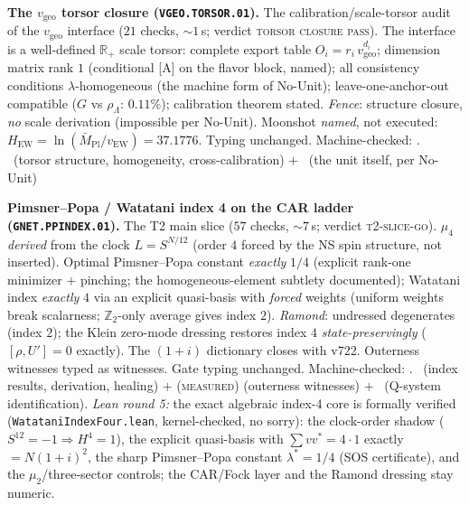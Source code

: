 \documentclass[11pt,a4paper]{article}
\newcommand{\Mbar}{\bar M_{\mathrm{Pl}}}
\newcommand{\Z}{\mathbb{Z}}
\theoremstyle{definition}
\begin{document}
\par\smallskip\noindent\textbf{The $v_{\mathrm{geo}}$ torsor closure
(\texttt{VGEO.TORSOR.01}).}
The calibration/scale-torsor audit of the $v_{\mathrm{geo}}$
interface ($21$ checks, ${\sim}1$\,s; verdict \textsc{torsor closure
pass}).  The interface is a well-defined $\mathbb R_+$ scale torsor:
complete export table $O_i=r_i\,v_{\mathrm{geo}}^{d_i}$; dimension
matrix rank $1$ (conditional [A] on the flavor block, named); all
consistency conditions $\lambda$-homogeneous (the machine form of
No-Unit); leave-one-anchor-out compatible ($G$ vs $\rho_\Lambda$:
$0.11\%$); calibration theorem stated.  \emph{Fence}: structure
closure, \emph{no} scale derivation (impossible per No-Unit).
Moonshot \emph{named}, not executed:
$H_{\mathrm{EW}}=\ln(\Mbar/v_{\mathrm{EW}})=37.1776$.  Typing
unchanged.
Machine-checked: .
\mE\ (torsor structure, homogeneity, cross-calibration) $+$ \mO\
(the unit itself, per No-Unit)
\par\smallskip

\par\smallskip\noindent\textbf{Pimsner--Popa / Watatani index 4 on
the CAR ladder (\texttt{GNET.PPINDEX.01}).}
The T2 main slice ($57$ checks, ${\sim}7$\,s; verdict
\textsc{t2-slice-go}).  $\mu_4$ \emph{derived} from the clock
$L=S^{N/12}$ (order $4$ forced by the NS spin structure, not
inserted).  Optimal Pimsner--Popa constant \emph{exactly} $1/4$
(explicit rank-one minimizer $+$ pinching; the homogeneous-element
subtlety documented); Watatani index \emph{exactly} $4$ via an
explicit quasi-basis with \emph{forced} weights (uniform weights
break scalarness; $\Z_2$-only average gives index $2$).
\emph{Ramond}: undressed degenerates (index $2$); the Klein
zero-mode dressing restores index $4$ \emph{state-preservingly}
($[\rho,U']=0$ exactly).  The $(1{+}i)$ dictionary closes with
v722.  Outerness witnesses typed as witnesses.  Gate typing
unchanged.
Machine-checked: .
\mE\ (index results, derivation, healing) $+$ (\textsc{measured})
(outerness witnesses) $+$ \mO\ (Q-system identification).
\emph{Lean round 5:} the exact algebraic index-4 core is formally
verified (\texttt{WatataniIndexFour.lean}, kernel-checked, no
sorry): the clock-order shadow ($S^{12}=-1 \Rightarrow H^4=1$), the
explicit quasi-basis with $\sum v v^* = 4\cdot 1$ exactly
$= N(1{+}i)^2$, the sharp Pimsner--Popa constant $\lambda^*=1/4$
(SOS certificate), and the $\mu_2$/three-sector controls; the
CAR/Fock layer and the Ramond dressing stay numeric.
\par\smallskip
\end{document}
